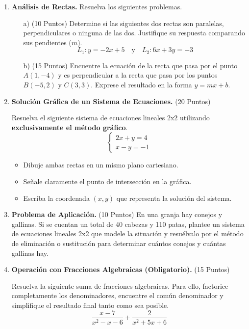 \documentclass[12pt]{article}
\begin{document}
\begin{enumerate}
    \vspace{0.5cm}

    \item \textbf{Análisis de Rectas.} Resuelva los siguientes problemas.
    
    \begin{itemize}
        \item[a)] (10 Puntos) Determine si las siguientes dos rectas son paralelas, perpendiculares o ninguna de las dos. Justifique su respuesta comparando sus pendientes ($m$).
        \[ L_1: y = -2x + 5 \quad \text{y} \quad L_2: 6x + 3y = -3 \]
        
        \item[b)] (15 Puntos) Encuentre la ecuación de la recta que pasa por el punto $A(1, -4)$ y es perpendicular a la recta que pasa por los puntos $B(-5, 2)$ y $C(3, 3)$. Exprese el resultado en la forma $y=mx+b$.
    \end{itemize}

    \vspace{0.5cm}
    
    \item \textbf{Solución Gráfica de un Sistema de Ecuaciones.} (20 Puntos)
    
    Resuelva el siguiente sistema de ecuaciones lineales 2x2 utilizando \textbf{exclusivamente el método gráfico}.
    \[ 
    \begin{cases} 
    2x + y = 4 \\
    x - y = -1
    \end{cases} 
    \]
    
    \begin{itemize}
        \item Dibuje ambas rectas en un mismo plano cartesiano.
        \item Señale claramente el punto de intersección en la gráfica.
        \item Escriba la coordenada $(x, y)$ que representa la solución del sistema.
    \end{itemize}
    
    \item \textbf{Problema de Aplicación.} (10 Puntos) En una granja hay conejos y gallinas. Si se cuentan un total de 40 cabezas y 110 patas, plantee un sistema de ecuaciones lineales 2x2 que modele la situación y resuélvalo por el método de eliminación o sustitución para determinar cuántos conejos y cuántas gallinas hay.
    

    \item \textbf{Operación con Fracciones Algebraicas (Obligatorio).} (15 Puntos)
    
    Resuelva la siguiente suma de fracciones algebraicas. Para ello, factorice completamente los denominadores, encuentre el común denominador y simplifique el resultado final tanto como sea posible.
    \[
    \frac{x - 7}{x^2 - x - 6} + \frac{2}{x^2 + 5x + 6}
    \]
\end{enumerate}



\end{document}
